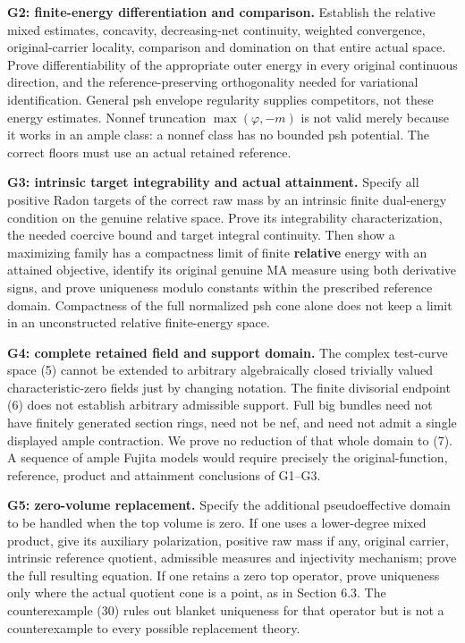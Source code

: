 \documentclass[
  10pt,
]{article}
\begin{document}
\textbf{G2: finite-energy differentiation and comparison.} Establish the
relative mixed estimates, concavity, decreasing-net continuity, weighted
convergence, original-carrier locality, comparison and domination on
that entire actual space. Prove differentiability of the appropriate
outer energy in every original continuous direction, and the
reference-preserving orthogonality needed for variational
identification. General psh envelope regularity supplies competitors,
not these energy estimates. Nonnef truncation \(\max(\varphi,-m)\) is
not valid merely because it works in an ample class: a nonnef class has
no bounded psh potential. The correct floors must use an actual retained
reference.

\textbf{G3: intrinsic target integrability and actual attainment.}
Specify all positive Radon targets of the correct raw mass by an
intrinsic finite dual-energy condition on the genuine relative space.
Prove its integrability characterization, the needed coercive bound and
target integral continuity. Then show a maximizing family has a
compactness limit of finite \textbf{relative} energy with an attained
objective, identify its original genuine MA measure using both
derivative signs, and prove uniqueness modulo constants within the
prescribed reference domain. Compactness of the full normalized psh cone
alone does not keep a limit in an unconstructed relative finite-energy
space.

\textbf{G4: complete retained field and support domain.} The complex
test-curve space (5) cannot be extended to arbitrary algebraically
closed trivially valued characteristic-zero fields just by changing
notation. The finite divisorial endpoint (6) does not establish
arbitrary admissible support. Full big bundles need not have finitely
generated section rings, need not be nef, and need not admit a single
displayed ample contraction. We prove no reduction of that whole domain
to (7). A sequence of ample Fujita models would require precisely the
original-function, reference, product and attainment conclusions of
G1--G3.

\textbf{G5: zero-volume replacement.} Specify the additional
pseudoeffective domain to be handled when the top volume is zero. If one
uses a lower-degree mixed product, give its auxiliary polarization,
positive raw mass if any, original carrier, intrinsic reference
quotient, admissible measures and injectivity mechanism; prove the full
resulting equation. If one retains a zero top operator, prove uniqueness
only where the actual quotient cone is a point, as in Section 6.3. The
counterexample (30) rules out blanket uniqueness for that operator but
is not a counterexample to every possible replacement theory.
\end{document}
